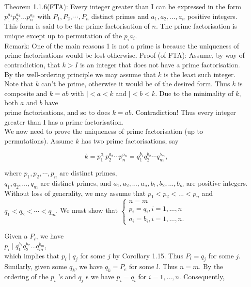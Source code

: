 \documentclass[10pt]{article}
\begin{document}
Theorem 1.1.6(FTA): Every integer greater than I can be expressed in the form $p_{1}^{a_{1}} p_{2}^{a_{2}} \ldots p_{n}^{a_{n}}$ with $P_{1}, P_{2}, \cdots, P_{n}$ distinct primes and $a_{1}, a_{2}, \ldots, a_{n}$ positive integers. This form is said to be the prime factorisation of $n$. The prime factorisation is unique except up to permutation of the $p_{i} a_{i}$.\\
Remark: One of the main reasons 1 is not a prime is because the uniqueness of prime factorisations would be lost otherwise. Proof (of FTA): Assume, by way of contradiction, that $k>I$ is an integer that does not have a prime factorisation. By the well-ordering principle we may assume that $k$ is the least such integer. Note that $k$ can't be prime, otherwise it would be of the desired form. Thus $k$ is composite and $k=a b$ with $\mid<a<k$ and $\mid<b<k$. Due to the minimality of $k$, both $a$ and $b$ have\\
prime factorisations, and so to does $k=a b$. Contradiction! Thus every integer greater than I has a prime factorisation.\\
We now need to prove the uniqueness of prime factorisation (up to permutations). Assume $k$ has two prime factorisations, say

$$
k=p_{1}^{a_{1}} p_{2}^{a_{2}} \cdots p_{n}^{a_{n}}=q_{1}^{b_{1}} q_{2}^{b_{2}} \cdots q_{m}^{b_{m}},
$$

where $p_{1}, p_{2}, \cdots, p_{n}$ are distinct primes,\\
$q_{1}, q_{2}, \ldots, q_{m}$ are distinct primes, and $a_{1}, a_{2}, \ldots, a_{n}, b_{1}, b_{2}, \ldots, b_{m}$ are positive integers. Without loss of generality, we may assume that $p_{1}<p_{2}<\ldots<p_{n}$ and $q_{1}<q_{2}<\cdots<q_{m}$. We must show that $\left\{\begin{array}{l}n=m \\ p_{i}=q_{i}, i=1, \ldots, n \\ a_{i}=b_{i}, i=1, \ldots, n .\end{array}\right.$

Given a $P_{i}$, we have\\
$p_{i} \mid q_{1}^{b_{1}} q_{2}^{b_{2}} \ldots q_{m}^{b_{m}}$,\\
which implies that $p_{i} \mid q_{j}$ for some $j$ by Corollary 1.15. Thus $P_{i}=q_{j}$ for some $j$. Similarly, given some $q_{k}$, we have $q_{k}=P_{e}$ for some $l$. Thus $n=m$. By the ordering of the $p_{i}$ 's and $q_{j}$ s we have $p_{i}=q_{i}$ for $i=1, \ldots, n$. Consequently,
\end{document}
